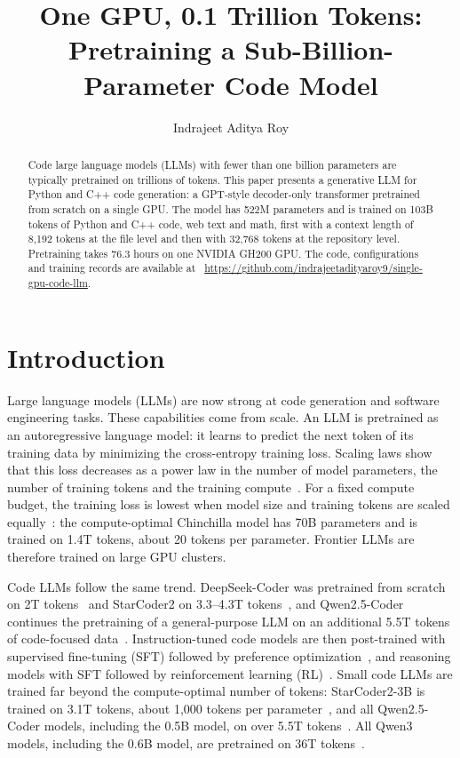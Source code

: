\documentclass[sigconf,nonacm,balance=false]{acmart}
\begin{document}
\title{One GPU, 0.1 Trillion Tokens: Pretraining a Sub-Billion-Parameter Code Model}

\author{Indrajeet Aditya Roy}
\affiliation{%
  \institution{}
  \country{}}

\begin{abstract}
Code large language models (LLMs) with fewer than one billion parameters are typically pretrained on trillions of
tokens. This paper presents a generative LLM for Python and C++ code generation: a GPT-style decoder-only transformer
pretrained from scratch on a single GPU. The model has 522M parameters and is trained on 103B tokens of Python and C++
code, web text and math, first with a context length of 8,192 tokens at the file level and then with 32,768 tokens at
the repository level. Pretraining takes 76.3 hours on one NVIDIA GH200 GPU. The code, configurations and training
records are available at \faGithub~\url{https://github.com/indrajeetadityaroy9/single-gpu-code-llm}.
\end{abstract}

\maketitle

\section{Introduction}

Large language models (LLMs) are now strong at code generation and software engineering tasks. These capabilities
come from scale. An LLM is pretrained as an autoregressive language model: it learns to predict
the next token of its training data by minimizing the cross-entropy training loss. Scaling laws show that this loss
decreases as a power law in the number of model parameters, the number of training tokens and the training
compute~\cite{kaplan2020scaling}. For a fixed compute budget, the training loss is lowest when model size and training
tokens are scaled equally~\cite{hoffmann2022chinchilla}: the compute-optimal Chinchilla model has 70B parameters and is
trained on 1.4T tokens, about 20 tokens per parameter. Frontier LLMs are therefore trained on large GPU clusters.

Code LLMs follow the same trend. DeepSeek-Coder was pretrained from scratch on 2T tokens~\cite{guo2024deepseekcoder}
and StarCoder2 on 3.3--4.3T tokens~\cite{lozhkov2024starcoder2}, and Qwen2.5-Coder continues the pretraining of a
general-purpose LLM on an additional 5.5T tokens of code-focused data~\cite{hui2024qwen25coder}. Instruction-tuned code
models are then post-trained with supervised fine-tuning (SFT) followed by preference
optimization~\cite{hui2024qwen25coder}, and reasoning models with SFT followed by reinforcement learning
(RL)~\cite{wang2025nemotroncascade}. Small code LLMs are trained far beyond the compute-optimal number of
tokens: StarCoder2-3B is trained on 3.1T tokens, about 1,000 tokens per parameter~\cite{lozhkov2024starcoder2}, and all
Qwen2.5-Coder models, including the 0.5B model, on over 5.5T tokens~\cite{hui2024qwen25coder}. All Qwen3 models,
including the 0.6B model, are pretrained on 36T tokens~\cite{yang2025qwen3}.
\end{document}
